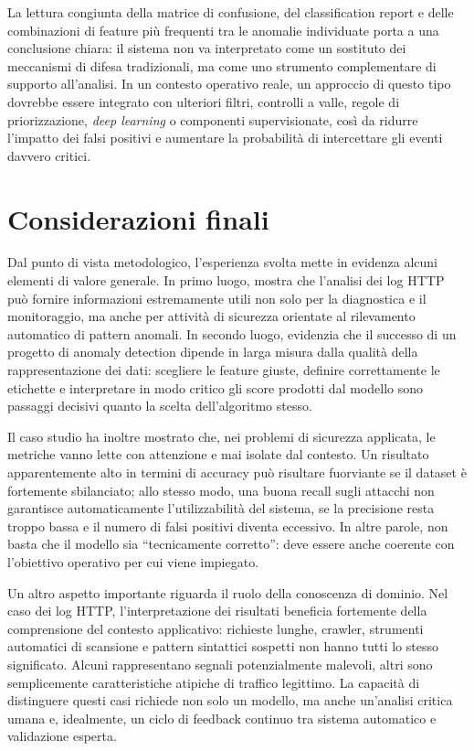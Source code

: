 La lettura congiunta della matrice di confusione, del classification report e delle combinazioni di feature più frequenti tra le anomalie individuate porta a una conclusione chiara: il sistema non va interpretato come un sostituto dei meccanismi di difesa tradizionali, ma come uno strumento complementare di supporto all’analisi. In un contesto operativo reale, un approccio di questo tipo dovrebbe essere integrato con ulteriori filtri, controlli a valle, regole di priorizzazione, \emph{deep learning} o componenti supervisionate, così da ridurre l’impatto dei falsi positivi e aumentare la probabilità di intercettare gli eventi davvero critici.

\section{Considerazioni finali}

Dal punto di vista metodologico, l’esperienza svolta mette in evidenza alcuni elementi di valore generale. In primo luogo, mostra che l’analisi dei log HTTP può fornire informazioni estremamente utili non solo per la diagnostica e il monitoraggio, ma anche per attività di sicurezza orientate al rilevamento automatico di pattern anomali. In secondo luogo, evidenzia che il successo di un progetto di anomaly detection dipende in larga misura dalla qualità della rappresentazione dei dati: scegliere le feature giuste, definire correttamente le etichette e interpretare in modo critico gli score prodotti dal modello sono passaggi decisivi quanto la scelta dell’algoritmo stesso.

Il caso studio ha inoltre mostrato che, nei problemi di sicurezza applicata, le metriche vanno lette con attenzione e mai isolate dal contesto. Un risultato apparentemente alto in termini di accuracy può risultare fuorviante se il dataset è fortemente sbilanciato; allo stesso modo, una buona recall sugli attacchi non garantisce automaticamente l’utilizzabilità del sistema, se la precisione resta troppo bassa e il numero di falsi positivi diventa eccessivo. In altre parole, non basta che il modello sia “tecnicamente corretto”: deve essere anche coerente con l’obiettivo operativo per cui viene impiegato.

Un altro aspetto importante riguarda il ruolo della conoscenza di dominio. Nel caso dei log HTTP, l’interpretazione dei risultati beneficia fortemente della comprensione del contesto applicativo: richieste lunghe, crawler, strumenti automatici di scansione e pattern sintattici sospetti non hanno tutti lo stesso significato. Alcuni rappresentano segnali potenzialmente malevoli, altri sono semplicemente caratteristiche atipiche di traffico legittimo. La capacità di distinguere questi casi richiede non solo un modello, ma anche un’analisi critica umana e, idealmente, un ciclo di feedback continuo tra sistema automatico e validazione esperta.

